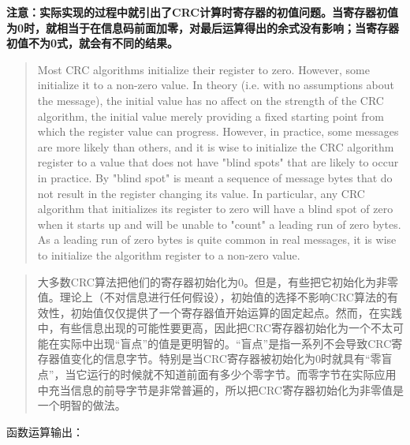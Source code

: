 \documentclass[
]{article}
\begin{document}
\textbf{注意：实际实现的过程中就引出了CRC计算时寄存器的初值问题。当寄存器初值为0时，就相当于在信息码前面加零，对最后运算得出的余式没有影响；当寄存器初值不为0式，就会有不同的结果。}

\begin{quote}
Most CRC algorithms initialize their register to zero. However, some
initialize it to a non-zero value. In theory (i.e. with no assumptions
about the message), the initial value has no affect on the strength of
the CRC algorithm, the initial value merely providing a fixed starting
point from which the register value can progress. However, in practice,
some messages are more likely than others, and it is wise to initialize
the CRC algorithm register to a value that does not have "blind spots"
that are likely to occur in practice. By "blind spot" is meant a
sequence of message bytes that do not result in the register changing
its value. In particular, any CRC algorithm that initializes its
register to zero will have a blind spot of zero when it starts up and
will be unable to "count" a leading run of zero bytes. As a leading run
of zero bytes is quite common in real messages, it is wise to initialize
the algorithm register to a non-zero value.
\end{quote}

\begin{quote}
大多数CRC算法把他们的寄存器初始化为0。但是，有些把它初始化为非零值。理论上（不对信息进行任何假设），初始值的选择不影响CRC算法的有效性，初始值仅仅提供了一个寄存器值开始运算的固定起点。然而，在实践中，有些信息出现的可能性要更高，因此把CRC寄存器初始化为一个不太可能在实际中出现``盲点''的值是更明智的。``盲点''是指一系列不会导致CRC寄存器值变化的信息字节。特别是当CRC寄存器被初始化为0时就具有``零盲点''，当它运行的时候就不知道前面有多少个零字节。而零字节在实际应用中充当信息的前导字节是非常普遍的，所以把CRC寄存器初始化为非零值是一个明智的做法。
\end{quote}

函数运算输出：
\end{document}
